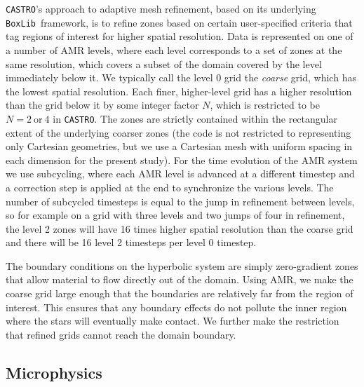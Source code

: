 \documentclass[iop]{../emulateapj}
\newcommand{\boxlib}{\texttt{BoxLib}}
\newcommand{\castro}{\texttt{CASTRO}}
\begin{document}
\castro's approach to adaptive mesh refinement, based on its underlying
\boxlib\ framework, is to refine zones based on certain user-specified
criteria that tag regions of interest for higher spatial
resolution. Data is represented on one of a number of AMR levels,
where each level corresponds to a set of zones at the same resolution,
which covers a subset of the domain covered by the level immediately
below it. We typically call the level 0 grid the \textit{coarse} grid,
which has the lowest spatial resolution. Each finer, higher-level grid
has a higher resolution than the grid below it by some integer factor
$N$, which is restricted to be $N = 2\ \text{or}\ 4$ in \castro. The
zones are strictly contained within the rectangular extent of the
underlying coarser zones (the code is not restricted to representing
only Cartesian geometries, but we use a Cartesian mesh with uniform
spacing in each dimension for the present study). For the time
evolution of the AMR system we use subcycling, where each AMR level is
advanced at a different timestep and a correction step is applied at
the end to synchronize the various levels. The number of
subcycled timesteps is equal to the jump in refinement between levels,
so for example on a grid with three levels and two jumps of four in
refinement, the level 2 zones will have 16 times higher spatial
resolution than the coarse grid and there will be 16 level 2 timesteps
per level 0 timestep.

The boundary conditions on the hyperbolic system are simply
zero-gradient zones that allow material to flow directly out of the
domain. Using AMR, we make the coarse grid large enough that the
boundaries are relatively far from the region of interest. This
ensures that any boundary effects do not pollute the inner region
where the stars will eventually make contact.  We further make the
restriction that refined grids cannot reach the domain boundary.

\subsection{Microphysics}
\end{document}
